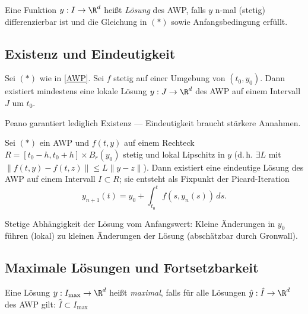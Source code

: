 \documentclass[11pt, a4paper]{article}
\begin{document}
 \begin{definition}
Eine Funktion $y:I\to\R^d$ heißt \emph{Lösung} des AWP, falls $y$  n-mal (stetig) differenzierbar ist und die Gleichung in $(*)$ sowie Anfangsbedingung erfüllt.
\end{definition}



\vspace{0.3cm} \par \subsection{Existenz und Eindeutigkeit}
 \begin{theorem}
Sei $(*)$ wie in \ref{AWP}. Sei $f$ stetig auf einer Umgebung von $(t_0,y_0)$. Dann existiert mindestens eine lokale Lösung $y: J \to \R^d $ des AWP auf einem Intervall $J$ um $t_0$.
\end{theorem}

 \begin{note}
Peano garantiert lediglich Existenz — Eindeutigkeit braucht stärkere Annahmen. 
\end{note}


 \begin{theorem}
Sei $(*)$ ein AWP und $f(t,y)$ auf einem Rechteck $R=[t_0-h,t_0+h]\times B_r(y_0)$ stetig und lokal Lipschitz in $y$ (d.\,h. $\exists L$ mit $\|f(t,y)-f(t,z)\|\le L\|y-z\|$). Dann existiert eine eindeutige Lösung des AWP auf einem Intervall $I\subset R$; sie entsteht als Fixpunkt der Picard-Iteration
\[
y_{n+1}(t)=y_0+\int_{t_0}^t f(s,y_n(s))\,ds.
\]
\end{theorem}

 \begin{corollary}
Stetige Abhängigkeit der Lösung vom Anfangswert: Kleine Änderungen in $y_0$ führen (lokal) zu kleinen Änderungen der Lösung (abschätzbar durch Gronwall).
\end{corollary}



\vspace{0.3cm} \par \subsection{Maximale Lösungen und Fortsetzbarkeit}
 \begin{definition} \label{def:max-Forsetzbarkeit}
Eine Lösung $y:I_{\max}\to\R^d$ heißt \emph{maximal}, falls für alle Lösungen $\hat{y}: \hat{I} \to \R^d$ des AWP gilt: $\hat{I}\subset I_{\max}$ 
\end{definition}
\end{document}
